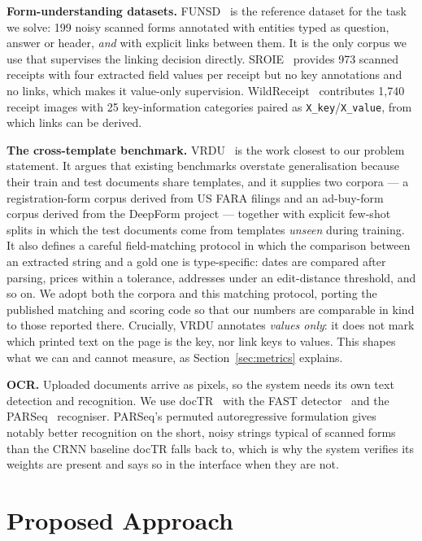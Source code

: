 \documentclass[11pt,a4paper]{article}
\newcommand{\code}[1]{\texttt{\small #1}}
\begin{document}
\textbf{Form-understanding datasets.} FUNSD~\cite{funsd} is the reference dataset for the task
we solve: 199 noisy scanned forms annotated with entities typed as question, answer or header,
\emph{and} with explicit links between them. It is the only corpus we use that supervises the
linking decision directly. SROIE~\cite{sroie} provides 973 scanned receipts with four extracted
field values per receipt but no key annotations and no links, which makes it value-only
supervision. WildReceipt~\cite{sdmgr} contributes 1{,}740 receipt images with 25 key-information
categories paired as \code{X\_key}/\code{X\_value}, from which links can be derived.

\textbf{The cross-template benchmark.} VRDU~\cite{vrdu} is the work closest to our problem
statement. It argues that existing benchmarks overstate generalisation because their train and
test documents share templates, and it supplies two corpora --- a registration-form corpus
derived from US FARA filings and an ad-buy-form corpus derived from the DeepForm project ---
together with explicit few-shot splits in which the test documents come from templates
\emph{unseen} during training. It also defines a careful field-matching protocol in which the
comparison between an extracted string and a gold one is type-specific: dates are compared after
parsing, prices within a tolerance, addresses under an edit-distance threshold, and so on. We
adopt both the corpora and this matching protocol, porting the published matching and scoring
code so that our numbers are comparable in kind to those reported there. Crucially, VRDU
annotates \emph{values only}: it does not mark which printed text on the page is the key, nor
link keys to values. This shapes what we can and cannot measure, as Section~\ref{sec:metrics}
explains.

\textbf{OCR.} Uploaded documents arrive as pixels, so the system needs its own text detection and
recognition. We use docTR~\cite{doctr} with the FAST detector~\cite{fast} and the
PARSeq~\cite{parseq} recogniser. PARSeq's permuted autoregressive formulation gives notably
better recognition on the short, noisy strings typical of scanned forms than the CRNN baseline
docTR falls back to, which is why the system verifies its weights are present and says so in the
interface when they are not.

\section{Proposed Approach}
\label{sec:approach}
\end{document}
